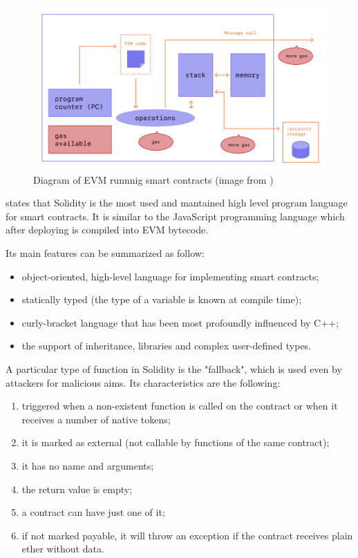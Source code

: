 \begin{figure}
    \centering
    \includegraphics[width=13cm]{logos/EVMSCRunning.png}
    \caption{Diagram of EVM runnnig smart contracts (image from \cite{EthDocs})}
    \label{fig:evmRunning}
\end{figure}


\citet{EthDocs} states that Solidity is the most used and mantained high level program language for smart contracts.
It is similar to the JavaScript programming language which after deploying is compiled into EVM bytecode. 

Its main features can be summarized as follow: 
\begin{itemize}
    \item object-oriented, high-level language for implementing smart contracts;
    \item statically typed (the type of a variable is known at compile time);
    \item curly-bracket language that has been most profoundly influenced by C++;
    \item the support of inheritance, libraries and complex user-defined types.
\end{itemize}

A particular type of function in Solidity is the "fallback", which is used even by attackers for malicious aims. 
Its characteristics are the following: 
\begin{enumerate}
    \item triggered when a non-existent function is called on the contract or when it receives a number of native tokens;
    \item it is marked as external (not callable by functions of the same contract);
    \item it has no name and arguments;
    \item the return value is empty;
    \item a contract can have just one of it;
    \item if not marked payable, it will throw an exception if the contract receives plain ether without data.
\end{enumerate}


